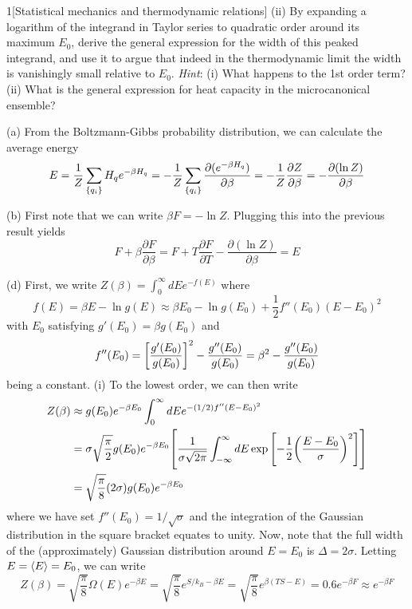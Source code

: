 \documentclass[12pt]{article}
\begin{document}
\begin{problem}{1}[Statistical mechanics and thermodynamic relations]
\qquad(ii) By expanding a logarithm of the integrand in Taylor series to
quadratic order around its maximum $E_0$, derive the general expression for the
width of this peaked integrand, and use it to argue that indeed in the
thermodynamic limit the width is vanishingly small relative to
$E_0$. \textit{Hint}: (i) What happens to the 1st order term? (ii) What is the
general expression for heat capacity in the microcanonical ensemble?
\begin{solution}
(a) From the Boltzmann-Gibbs probability distribution, we can calculate the
average energy
\begin{align}
    E
    =\frac1Z\sum_\qty{q_i}H_qe^{-\beta H_q}
    =-\frac1Z\sum_\qty{q_i}\frac{\partial(e^{-\beta H_q})}{\partial\beta}
    =-\frac1Z\frac{\partial Z}{\partial\beta}
    =-\frac{\partial(\ln Z)}{\partial\beta}
\end{align}

(b) First note that we can write $\beta F=-\ln Z$. Plugging this into the
previous result yields
\begin{equation}
    F+\beta\frac{\partial F}{\partial\beta}=F+T\frac{\partial F}{\partial T}
    -\frac{\partial(\ln Z)}{\partial\beta}=E 
\end{equation}

(d) First, we write $Z(\beta)=\int_0^\infty dE e^{-f(E)}$ where
\begin{equation}
    f(E)=\beta E-\ln g(E)\approx \beta E_0-\ln g(E_0)+\frac12f''(E_0)(E-E_0)^2
\end{equation}
with $E_0$ satisfying $g'(E_0)=\beta g(E_0)$ and
\begin{equation}\label{p1d:fpp}
    f''(E_0)=\qty[\frac{g'(E_0)}{g(E_0)}]^2-\frac{g''(E_0)}{g(E_0)}
    =\beta^2-\frac{g''(E_0)}{g(E_0)}
\end{equation}
being a constant. (i) To the lowest order, we can then write
\begin{align}
    Z(\beta)
    &\approx g(E_0)e^{-\beta E_0}\int_0^\infty dE e^{-(1/2)f''(E-E_0)^2}\notag\\
    &=\sigma\sqrt{\frac\pi2} g(E_0)e^{-\beta E_0}\qty[
    \frac1{\sigma \sqrt{2\pi}}\int_{-\infty}^\infty
    dE\exp\qty[-\frac12\qty(\frac{E-E_0}{\sigma})^2]]\notag\\
    &=\sqrt{\frac\pi8}(2\sigma)g(E_0)e^{-\beta E_0}
\end{align}
where we have set $f''(E_0)=1/\sqrt\sigma$ and the integration of the Gaussian
distribution in the square bracket equates to unity. Now, note that the full
width of the (approximately) Gaussian distribution around $E=E_0$ is
$\Delta=2\sigma$. Letting $E=\expval{E}=E_0$, we can write
\begin{equation}
    Z(\beta)=\sqrt{\frac\pi8}\Omega(E)e^{-\beta E} 
    =\sqrt{\frac\pi8}e^{S/k_B-\beta E}
    =\sqrt{\frac\pi8}e^{\beta(TS-E)}
    =0.6 e^{-\beta F}
    \approx e^{-\beta F}
\end{equation}


\end{solution}
\end{problem}
\end{document}
